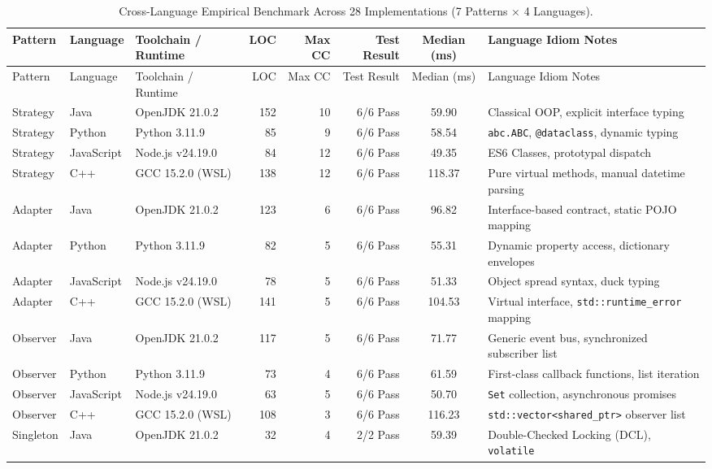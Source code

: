 \documentclass[11pt,a4paper]{article}
\begin{document}
\footnotesize
\begin{xltabular}{\linewidth}{@{}p{22mm}p{16mm}p{25mm}rrrcX@{}}
\caption{Cross-Language Empirical Benchmark Across 28 Implementations (7 Patterns $\times$ 4 Languages).}\label{tab:cross_lang}\\
\toprule
Pattern & Language & Toolchain / Runtime & LOC & Max CC & Test Result & Median (ms) & Language Idiom Notes\\\midrule
\endfirsthead
\toprule
Pattern & Language & Toolchain / Runtime & LOC & Max CC & Test Result & Median (ms) & Language Idiom Notes\\\midrule
\endhead
\bottomrule
\endfoot
Strategy & Java & OpenJDK 21.0.2 & 152 & 10 & 6/6 Pass & 59.90 & Classical OOP, explicit interface typing\\
Strategy & Python & Python 3.11.9 & 85 & 9 & 6/6 Pass & 58.54 & \texttt{abc.ABC}, \texttt{@dataclass}, dynamic typing\\
Strategy & JavaScript & Node.js v24.19.0 & 84 & 12 & 6/6 Pass & 49.35 & ES6 Classes, prototypal dispatch\\
Strategy & C++ & GCC 15.2.0 (WSL) & 138 & 12 & 6/6 Pass & 118.37 & Pure virtual methods, manual datetime parsing\\\midrule
Adapter & Java & OpenJDK 21.0.2 & 123 & 6 & 6/6 Pass & 96.82 & Interface-based contract, static POJO mapping\\
Adapter & Python & Python 3.11.9 & 82 & 5 & 6/6 Pass & 55.31 & Dynamic property access, dictionary envelopes\\
Adapter & JavaScript & Node.js v24.19.0 & 78 & 5 & 6/6 Pass & 51.33 & Object spread syntax, duck typing\\
Adapter & C++ & GCC 15.2.0 (WSL) & 141 & 5 & 6/6 Pass & 104.53 & Virtual interface, \texttt{std::runtime\_error} mapping\\\midrule
Observer & Java & OpenJDK 21.0.2 & 117 & 5 & 6/6 Pass & 71.77 & Generic event bus, synchronized subscriber list\\
Observer & Python & Python 3.11.9 & 73 & 4 & 6/6 Pass & 61.59 & First-class callback functions, list iteration\\
Observer & JavaScript & Node.js v24.19.0 & 63 & 5 & 6/6 Pass & 50.70 & \texttt{Set} collection, asynchronous promises\\
Observer & C++ & GCC 15.2.0 (WSL) & 108 & 3 & 6/6 Pass & 116.23 & \texttt{std::vector<shared\_ptr>} observer list\\\midrule
Singleton & Java & OpenJDK 21.0.2 & 32 & 4 & 2/2 Pass & 59.39 & Double-Checked Locking (DCL), \texttt{volatile}\\

\end{xltabular}
\end{document}
